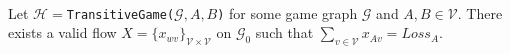 \begin{lemma} \ \\
  \label{gameflow}
  Let $\mathcal{H} = $\texttt{TransitiveGame(}$\mathcal{G}, A, B$\texttt{)} for some game graph $\mathcal{G}$ and $A,
  B \in \mathcal{V}$. There exists a valid flow
  $X = \{x_{wv}\}_{\mathcal{V} \times \mathcal{V}}$ on $\mathcal{G}_0$ such that
  $\sum\limits_{v \in \mathcal{V}}x_{Av} = Loss_A$.
\end{lemma}
